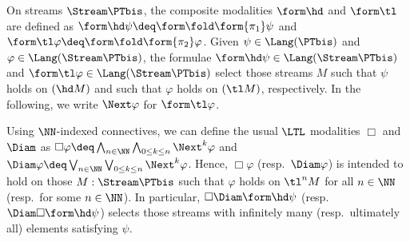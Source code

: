 \begin{example}
\label{ex:form:stream}
On streams $\Stream\PTbis$, the composite modalities $\form\hd$ and $\form\tl$
are defined as $\form\hd \psi \deq \form\fold \form{\pi_1} \psi$
and $\form\tl \varphi \deq \form\fold \form{\pi_2} \varphi$.
Given $\psi \in \Lang(\PTbis)$ and $\varphi \in \Lang(\Stream\PTbis)$,
the formulae $\form\hd\psi \in \Lang(\Stream\PTbis)$
and $\form\tl\varphi \in \Lang(\Stream\PTbis)$
select those streams $M$ such that $\psi$ holds on $(\hd M)$
and such that $\varphi$ holds on $(\tl M)$, respectively.
In the following, we write $\Next\varphi$ for $\form\tl\varphi$.

Using $\NN$-indexed connectives,
we can define
the usual $\LTL$ modalities $\Box$ and $\Diam$ as 
$\Box \varphi \deq \bigwedge_{n \in \NN} \bigwedge_{0\leq k \leq n} \Next^k \varphi$
and
$\Diam \varphi \deq \bigvee_{n \in \NN} \bigvee_{0\leq k \leq n} \Next^k \varphi$.
Hence, $\Box \varphi$ (resp.\ $\Diam \varphi$)
is intended to hold on those $M : \Stream\PTbis$
such that $\varphi$ holds on $\tl^n M$ for all $n \in \NN$
(resp.\ for some $n \in \NN$).
In particular, $\Box\Diam \form\hd \psi$ (resp.\ $\Diam\Box\form\hd\psi$)
selects those streams with infinitely many (resp.\ ultimately all) elements
satisfying $\psi$.
\end{example}


